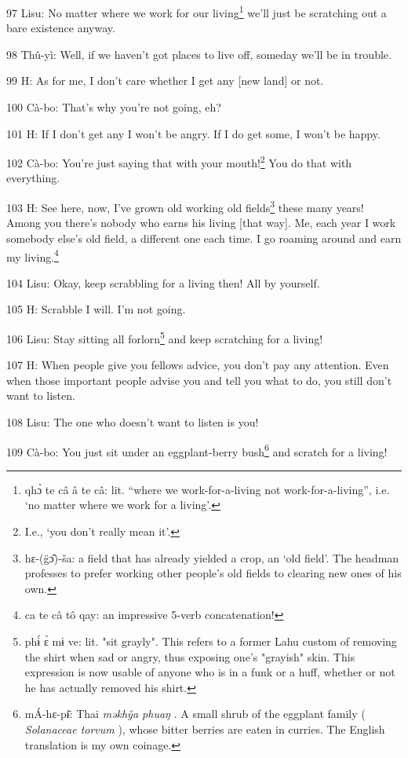 97 Lisu: No matter where we work for our living\footnote{qhɔ̀ te câ â te câ: lit. ``where we work-for-a-living not work-for-a-living'', i.e. `no matter where we work for a living'.} we'll just be scratching out
a bare existence anyway.

98 Thû-yì: Well, if we haven't got places to live off, someday we'll be in trouble.

99 H: As for me, I don't care whether I get any [new land] or not.

100 Cà-bo: That's why you're not going, eh?

101 H: If I don't get any I won't be angry. If I do get some, I won't be happy.

102 Cà-bo: You're just saying that with your mouth!\footnote{I.e., `you don't really mean it'.} You do that with everything.

103 H: See here, now, I've grown old working old fields\footnote{hɛ-(g̈ɔ̂)-ša: a field that has already yielded a crop, an `old field'. The headman professes to prefer working other people's old fields to clearing new ones of his own.} these many years! Among
you there's nobody who earns his living [that way]. Me, each year I work somebody
else's old field, a different one each time. I go roaming around and earn my living.\footnote{ca te câ tô qay: an impressive 5-verb concatenation!}

104 Lisu: Okay, keep scrabbling for a living then! All by yourself.

105 H: Scrabble I will. I'm not going.

106 Lisu: Stay sitting all forlorn\footnote{phɨ́ ɛ̀ mɨ ve: lit. "sit grayly". This refers to a former Lahu custom of removing the shirt when sad or angry, thus exposing one's "grayish" skin. This expression is now usable of anyone who is in a funk or a huff, whether or not he has actually removed his shirt.} and keep scratching for a living!

107 H: When people give you fellows advice, you don't pay any attention. Even when
those important people advise you and tell you what to do, you still don't want
to listen.

108 Lisu: The one who doesn't want to listen is you!

109 Cà-bo: You just sit under an eggplant-berry bush\footnote{mÁ-hɛ-pɨ̄: Thai  \textit{məkhy̌a phuaŋ }. A small shrub of the eggplant family ( \textit{Solanaceae torvum }), whose bitter berries are eaten in curries. The English translation is my own coinage.} and scratch for a living!


